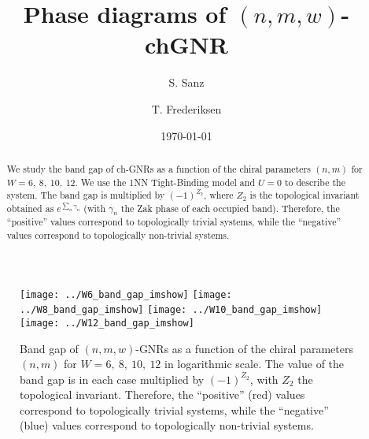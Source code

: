 \documentclass[amsmath,%
amssymb,prb,superscriptaddress]{revtex4}
\begin{document}
\title{Phase diagrams of $(n,m,w)$-chGNR}

\author{S. Sanz}

\author{T. Frederiksen}

\date{\today}

\begin{abstract}
We study the band gap of ch-GNRs as a function of the chiral parameters $(n,m)$ for $W=6, \ 8, \ 10, \ 12$. We use the 1NN Tight-Binding model and $U=0$ to describe the system. The band gap is multiplied by $(-1)^{Z_{2}}$, where $Z_{2}$ is the topological invariant obtained as $e^{\sum_{n}\gamma_{n}}$ (with $\gamma_{n}$ the Zak phase of each occupied band). Therefore, the ``positive'' values correspond to topologically trivial systems, while the ``negative'' values correspond to topologically non-trivial systems.%
\end{abstract}


\maketitle


\begin{figure*}
	\texttt{[image: ../W6\_band\_gap\_imshow]}
	\texttt{[image: ../W8\_band\_gap\_imshow]}
	\texttt{[image: ../W10\_band\_gap\_imshow]}
	\texttt{[image: ../W12\_band\_gap\_imshow]}
	\caption{Band gap of $(n,m,w)$-GNRs as a function of the chiral parameters $(n,m)$ for $W=6, \ 8, \ 10, \ 12$ in logarithmic scale. The value of the band gap is in each case multiplied by $(-1)^{Z_{2}}$, with $Z_{2}$ the topological invariant. Therefore, the ``positive'' (red) values correspond to topologically trivial systems, while the ``negative'' (blue) values correspond to topologically non-trivial systems.}
\end{figure*}
\end{document}
